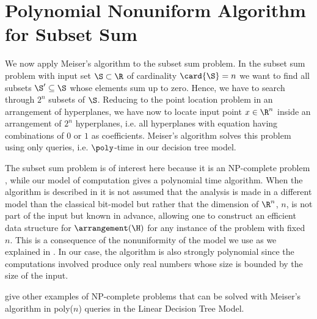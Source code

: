 \section{Polynomial Nonuniform Algorithm for Subset Sum}

We now apply Meiser's algorithm to the subset sum problem. In the subset sum
problem with input set $\S \subset \R$ of cardinality $\card{\S} = n$ we want to
find all subsets $\S' \subseteq \S$ whose elements sum up to zero. Hence, we have
to search through $2^n$ subsets of $\S$. Reducing to the point location problem
in an arrangement of hyperplanes, we have now to locate input point $x \in
\R^n$ inside an arrangement of $2^n$ hyperplanes, i.e. all hyperplanes with
equation having combinations of $0$ or $1$ as coefficients. Meiser's algorithm
solves this problem using only  queries, i.e. $\poly$-time
in our decision tree model.

The subset sum problem is of interest here because it is an NP-complete problem
\cite{karp:1972}, while our model of computation gives a polynomial time
algorithm. When the algorithm is described in \cite{burgisser:1997} it is not
assumed that the analysis is made in a different model than the classical
bit-model but rather that the dimension of $\R^n$, $n$, is not part of the input
but known in advance, allowing one to construct an efficient data structure for
$\arrangement(\H)$ for any instance of the problem with fixed $n$.
This is a consequence of the nonuniformity of the model we use as we explained
in . In our case, the algorithm is
also strongly polynomial since the computations involved produce only real
numbers whose size is bounded by the size of the input.

\citet*{meiser:1993,burgisser:1997} give other examples of
NP-complete problems that can be solved with Meiser's algorithm in poly(\(n\))
queries in the Linear Decision Tree Model.

